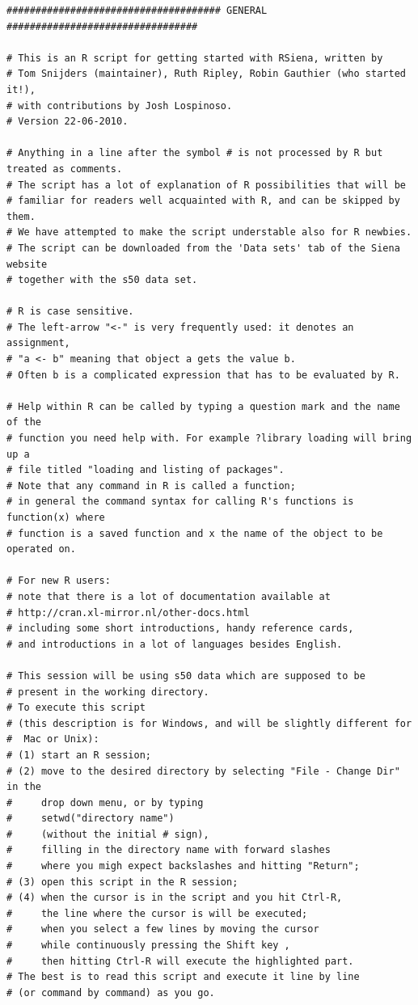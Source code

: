 \documentclass[a4paper,fleqn]{article}
\newcommand{\+}{\, + \,}
\begin{document}
{\begin{verbatim}
##################################### GENERAL #################################

# This is an R script for getting started with RSiena, written by
# Tom Snijders (maintainer), Ruth Ripley, Robin Gauthier (who started it!),
# with contributions by Josh Lospinoso.
# Version 22-06-2010.

# Anything in a line after the symbol # is not processed by R but treated as comments.
# The script has a lot of explanation of R possibilities that will be
# familiar for readers well acquainted with R, and can be skipped by them.
# We have attempted to make the script understable also for R newbies.
# The script can be downloaded from the 'Data sets' tab of the Siena website
# together with the s50 data set.

# R is case sensitive.
# The left-arrow "<-" is very frequently used: it denotes an assignment,
# "a <- b" meaning that object a gets the value b.
# Often b is a complicated expression that has to be evaluated by R.

# Help within R can be called by typing a question mark and the name of the
# function you need help with. For example ?library loading will bring up a
# file titled "loading and listing of packages".
# Note that any command in R is called a function;
# in general the command syntax for calling R's functions is function(x) where
# function is a saved function and x the name of the object to be operated on.

# For new R users:
# note that there is a lot of documentation available at
# http://cran.xl-mirror.nl/other-docs.html
# including some short introductions, handy reference cards,
# and introductions in a lot of languages besides English.

# This session will be using s50 data which are supposed to be
# present in the working directory.
# To execute this script
# (this description is for Windows, and will be slightly different for
#  Mac or Unix):
# (1) start an R session;
# (2) move to the desired directory by selecting "File - Change Dir" in the
#     drop down menu, or by typing
#     setwd("directory name")
#     (without the initial # sign),
#     filling in the directory name with forward slashes
#     where you migh expect backslashes and hitting "Return";
# (3) open this script in the R session;
# (4) when the cursor is in the script and you hit Ctrl-R,
#     the line where the cursor is will be executed;
#     when you select a few lines by moving the cursor
#     while continuously pressing the Shift key ,
#     then hitting Ctrl-R will execute the highlighted part.
# The best is to read this script and execute it line by line
# (or command by command) as you go.



\end{verbatim}}
\end{document}
